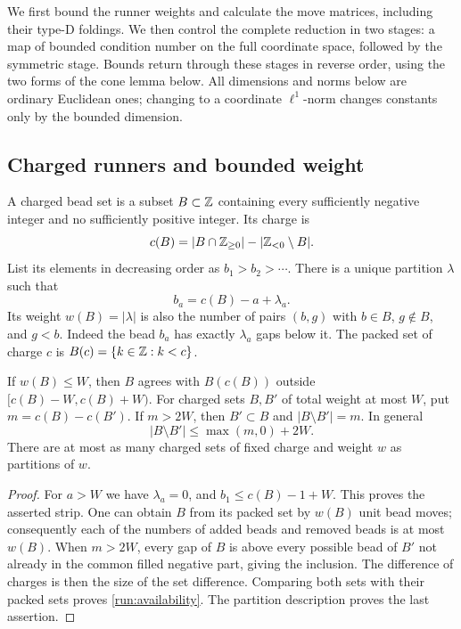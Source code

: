 We first bound the runner weights and calculate the move matrices,
including their type-D foldings.  We then control the complete
reduction in two stages: a map of bounded condition number on the
full coordinate space, followed by the symmetric stage.  Bounds
return through these stages in reverse order, using the two forms
of the cone lemma below.
All dimensions and norms
below are ordinary Euclidean ones; changing to a coordinate
\(\ell^1\)-norm changes constants only by the bounded dimension.

\subsection{Charged runners and bounded weight}

A charged bead set is a subset \(B\subset\mathbb Z\) containing every
sufficiently negative integer and no sufficiently positive integer.
Its charge is
\[
 c(B)=|B\cap\mathbb Z_{\geq0}|-|\mathbb Z_{<0}\setminus B|.
\]
List its elements in decreasing order as \(b_1>b_2>\cdots\).
There is a unique partition \(\lambda\) such that
\[
 b_a=c(B)-a+\lambda_a.
\]
Its weight \(w(B)=|\lambda|\) is also the number of pairs
\((b,g)\) with \(b\in B\), \(g\notin B\), and \(g<b\).
Indeed the bead \(b_a\) has exactly \(\lambda_a\) gaps below it.
The packed set of charge \(c\) is
\(B(c)=\{k\in\mathbb Z:k<c\}\).

\begin{lemma}\label{run:localization}
If \(w(B)\leq W\), then \(B\) agrees with \(B(c(B))\) outside
\([c(B)-W,c(B)+W)\).  For charged sets \(B,B'\) of total weight at
most \(W\), put \(m=c(B)-c(B')\).  If \(m>2W\), then
\(B'\subset B\) and \(|B\setminus B'|=m\).  In general
\begin{equation}\label{run:availability}
 |B\setminus B'|\leq \max(m,0)+2W.
\end{equation}
There are at most as many charged sets of fixed charge and weight
\(w\) as partitions of \(w\).
\end{lemma}

\begin{proof}
For \(a>W\) we have \(\lambda_a=0\), and
\(b_1\leq c(B)-1+W\).  This proves the asserted strip.
One can obtain \(B\) from its packed set by \(w(B)\) unit bead
moves; consequently each of the numbers of added beads and removed
beads is at most \(w(B)\).
When \(m>2W\), every gap of \(B\) is above every possible bead
of \(B'\) not already in the common filled negative part, giving
the inclusion.  The difference of charges is then the size of the
set difference.  Comparing both sets with their packed sets proves
\eqref{run:availability}.  The partition description proves the
last assertion.
\end{proof}

